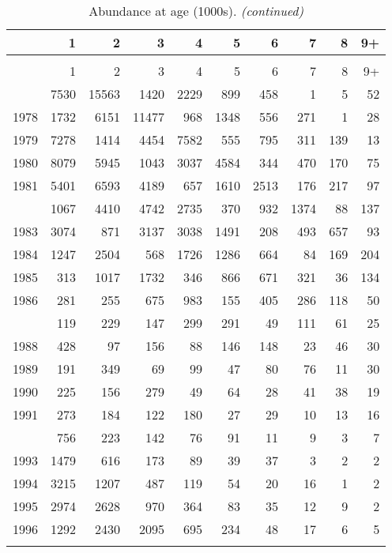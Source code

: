 \documentclass[
]{article}
\begin{document}
\begin{longtable}[t]{lrrrrrrrrr}
\caption{\label{tab:NAA-table}Abundance at age (1000s).}\\
\toprule
  & 1 & 2 & 3 & 4 & 5 & 6 & 7 & 8 & 9+\\
\midrule
\endfirsthead
\caption[]{Abundance at age (1000s). \textit{(continued)}}\\
\toprule
  & 1 & 2 & 3 & 4 & 5 & 6 & 7 & 8 & 9+\\
\midrule
\endhead

\endfoot
\bottomrule
\endlastfoot
1977 & 7530 & 15563 & 1420 & 2229 & 899 & 458 & 1 & 5 & 52\\
1978 & 1732 & 6151 & 11477 & 968 & 1348 & 556 & 271 & 1 & 28\\
1979 & 7278 & 1414 & 4454 & 7582 & 555 & 795 & 311 & 139 & 13\\
1980 & 8079 & 5945 & 1043 & 3037 & 4584 & 344 & 470 & 170 & 75\\
1981 & 5401 & 6593 & 4189 & 657 & 1610 & 2513 & 176 & 217 & 97\\
\addlinespace
1982 & 1067 & 4410 & 4742 & 2735 & 370 & 932 & 1374 & 88 & 137\\
1983 & 3074 & 871 & 3137 & 3038 & 1491 & 208 & 493 & 657 & 93\\
1984 & 1247 & 2504 & 568 & 1726 & 1286 & 664 & 84 & 169 & 204\\
1985 & 313 & 1017 & 1732 & 346 & 866 & 671 & 321 & 36 & 134\\
1986 & 281 & 255 & 675 & 983 & 155 & 405 & 286 & 118 & 50\\
\addlinespace
1987 & 119 & 229 & 147 & 299 & 291 & 49 & 111 & 61 & 25\\
1988 & 428 & 97 & 156 & 88 & 146 & 148 & 23 & 46 & 30\\
1989 & 191 & 349 & 69 & 99 & 47 & 80 & 76 & 11 & 30\\
1990 & 225 & 156 & 279 & 49 & 64 & 28 & 41 & 38 & 19\\
1991 & 273 & 184 & 122 & 180 & 27 & 29 & 10 & 13 & 16\\
\addlinespace
1992 & 756 & 223 & 142 & 76 & 91 & 11 & 9 & 3 & 7\\
1993 & 1479 & 616 & 173 & 89 & 39 & 37 & 3 & 2 & 2\\
1994 & 3215 & 1207 & 487 & 119 & 54 & 20 & 16 & 1 & 2\\
1995 & 2974 & 2628 & 970 & 364 & 83 & 35 & 12 & 9 & 2\\
1996 & 1292 & 2430 & 2095 & 695 & 234 & 48 & 17 & 6 & 5\\
\addlinespace

\end{longtable}
\end{document}
